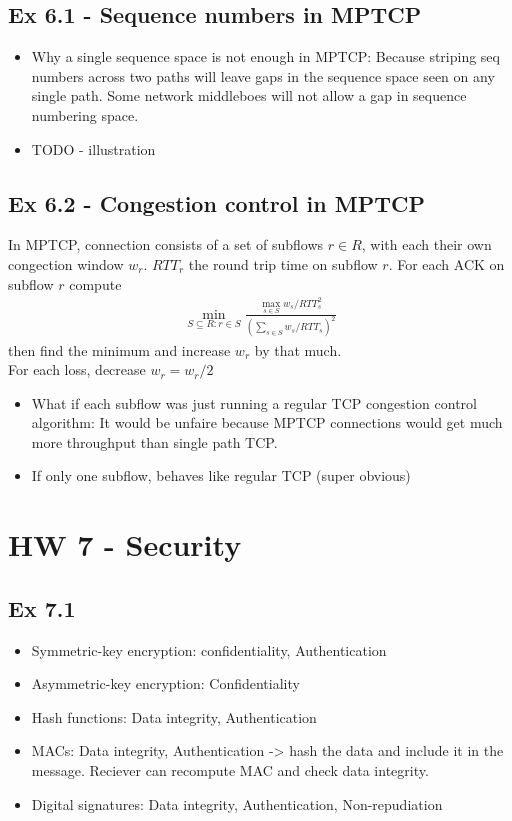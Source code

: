 \subsection*{Ex 6.1 - Sequence numbers in MPTCP}
\begin{itemize}
	\item Why a single sequence space is not enough in MPTCP: Because striping seq numbers across two paths will leave gaps in the sequence space seen on any single path. Some network middleboes will not allow a gap in sequence numbering space.
	\item TODO - illustration
\end{itemize}

\subsection*{Ex 6.2 - Congestion control in MPTCP}
In MPTCP, connection consists of a set of subflows $r \in R$, with each their own congection window $w_r$. $RTT_r$ the round trip time on subflow $r$. For each ACK on subflow $r$ compute 
\begin{align*}
	\min_{S \subseteq R: r \in S} \frac{\max_{s \in S} w_s / RTT^2_s}{(\sum_{s \in S} w_s / RTT_s)^2}
\end{align*}
then find the minimum and increase $w_r$ by that much. \\
For each loss, decrease $w_r = w_r /2$

\begin{itemize}
	\item What if each subflow was just running a regular TCP congestion control algorithm: It would be unfaire because MPTCP connections would get much more throughput than single path TCP.

	\item If only one subflow, behaves like regular TCP (super obvious)
\end{itemize}

\section*{HW 7 - Security}

\subsection*{Ex 7.1}
\begin{itemize}
	\item Symmetric-key encryption: confidentiality, Authentication
	\item Asymmetric-key encryption: Confidentiality
	\item Hash functions: Data integrity, Authentication
	\item MACs: Data integrity, Authentication -> hash the data and include it in the message. Reciever can recompute MAC and check data integrity.
	\item Digital signatures: Data integrity, Authentication, Non-repudiation
\end{itemize}

